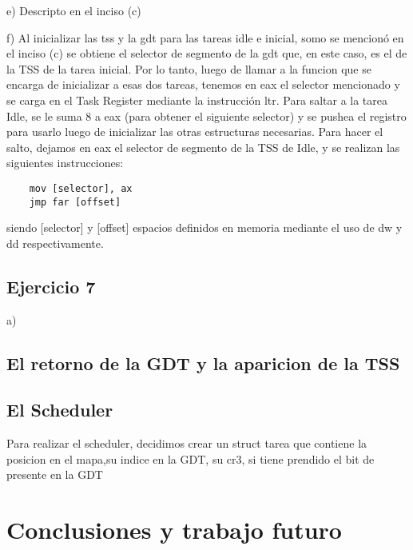 \documentclass[a4paper]{article}
\newenvironment{codesnippet}{%
	\begin{Sbox}\begin{minipage}{\textwidth}\sffamily\small}%
	{\end{minipage}\end{Sbox}%
		\begin{center}%
		\vspace{-0.4cm}\colorbox{litegrey}{\TheSbox}\end{center}\vspace{0.3cm}}
\begin{document}
e) Descripto en el inciso (c)

f) Al inicializar las tss y la gdt para las tareas idle e inicial, somo se mencionó en el inciso (c) se obtiene el selector de segmento de la gdt que, en este caso, es el de
la TSS de la tarea inicial. Por lo tanto, luego de llamar a la funcion que se encarga de inicializar a esas dos tareas, tenemos en eax el selector mencionado y se carga en el Task Register mediante la instrucción ltr.
Para saltar a la tarea Idle, se le suma 8 a eax (para obtener el siguiente selector) y se pushea el registro
para usarlo luego de inicializar las otras estructuras necesarias. Para hacer el salto, dejamos en eax el selector de segmento de la TSS de Idle, y se realizan las siguientes instrucciones:
\begin{verbatim}
	mov [selector], ax
	jmp far [offset]
\end{verbatim}
siendo [selector] y [offset] espacios definidos en memoria mediante el uso de dw y dd respectivamente.

\subsection{Ejercicio 7}

a)




\subsection{El retorno de la GDT y la aparicion de la TSS}

\subsection{El Scheduler}
Para realizar el scheduler, decidimos crear un struct tarea que contiene la posicion en el mapa,su indice en la GDT, su cr3, si tiene prendido el bit de presente en la GDT

\section{Conclusiones y trabajo futuro}






\end{document}
